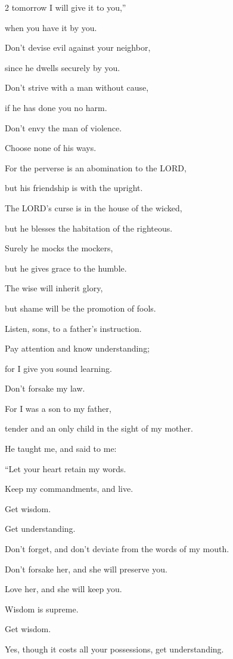 \begin{multicols}{2}
tomorrow I will give it to you,”

when you have it by you.


\myverse{}Don’t devise evil against your neighbor,

since he dwells securely by you.


\myverse{}Don’t strive with a man without cause,

if he has done you no harm.


\myverse{}Don’t envy the man of violence.

Choose none of his ways.


\myverse{}For the perverse is an abomination to the LORD,

but his friendship is with the upright.


\myverse{}The LORD’s curse is in the house of the wicked,

but he blesses the habitation of the righteous.


\myverse{}Surely he mocks the mockers,

but he gives grace to the humble.


\myverse{}The wise will inherit glory,

but shame will be the promotion of fools.


\mychapter{} \myverse*{}Listen, sons, to a father’s instruction.

Pay attention and know understanding;


\myverse{}for I give you sound learning.

Don’t forsake my law.


\myverse{}For I was a son to my father,

tender and an only child in the sight of my mother.


\myverse{}He taught me, and said to me:

“Let your heart retain my words.

Keep my commandments, and live.


\myverse{}Get wisdom.

Get understanding.

Don’t forget, and don’t deviate from the words of my mouth.


\myverse{}Don’t forsake her, and she will preserve you.

Love her, and she will keep you.


\myverse{}Wisdom is supreme.

Get wisdom.

Yes, though it costs all your possessions, get understanding.



\end{multicols}
